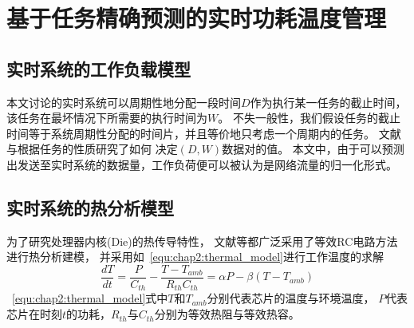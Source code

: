 


\chapter{基于任务精确预测的实时功耗温度管理}
\label{cha:DPTM}

\section{实时系统的工作负载模型}
\label{sec:workload}
本文讨论的实时系统可以周期性地分配一段时间$D$作为执行某一任务的截止时间，该任务在最坏情况下所需要的执行时间为$W$。 不失一般性，我们假设任务的截止时间等于系统周期性分配的时间片，并且等价地只考虑一个周期内的任务。 文献与根据任务的性质研究了如何 决定$(D,W)$数据对的值。 本文中，由于可以预测出发送至实时系统的数据量，工作负荷便可以被认为是网络流量的归一化形式。


\section{实时系统的热分析模型}
\label{sec:thermal}
为了研究处理器内核(Die)的热传导特性， 文献等都广泛采用了等效RC电路方法进行热分析建模， 并采用如~\ref{equ:chap2:thermal_model}进行工作温度的求解
\begin{equation}
\label{equ:chap2:thermal_model}
\frac{dT}{dt} = \frac{P}{C_{th}}-\frac{T-T_{amb}}{R_{th}C_{th}} = \alpha P -\beta (T-T_{amb})
\end{equation}
~\ref{equ:chap2:thermal_model}式中$T$和$T_{amb}$分别代表芯片的温度与环境温度， $P$代表芯片在时刻$t$的功耗，$R_{th}$与$C_{th}$分别为等效热阻与等效热容。

